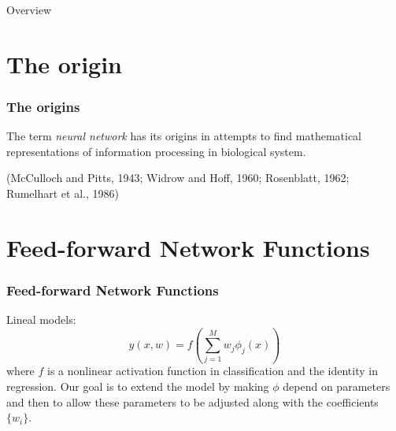 


\begin{frame}{Overview}
  \tableofcontents
\end{frame}

\section{The origin}
\begin{frame}
  \frametitle{The origins}
  The term \textit{neural network} has its origins
  in attempts to find mathematical 
  representations of information processing in 
  biological system. 
  
  (McCulloch and Pitts, 1943; Widrow and Hoff, 1960; Rosenblatt, 1962; Rumelhart et al., 1986)
\end{frame}

\section{Feed-forward Network Functions}

\begin{frame}
  \frametitle{Feed-forward Network Functions}
  Lineal models: 
  \begin{equation}
    y(x,w) = 
    f 
    \left(
      \sum_{j = 1}^M
      w_j \phi_j(x)
    \right)
  \end{equation}
where $f$ is a nonlinear activation function in classification 
and the identity in regression. 
Our goal is to extend the model by making $\phi$ 
depend on parameters and then to allow these parameters 
to be adjusted along with the coefficients $\{w_i\}$. 
\end{frame}

